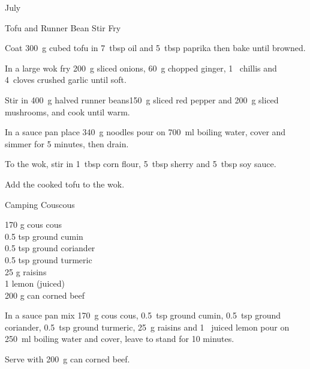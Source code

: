 \begin{menu}{July}
\begin{recipe}{2}{Tofu and Runner Bean Stir Fry}
    \begin{instructions}
    \item 
        Coat
        300~g cubed tofu
        in
        7~tbsp  oil
        and
        5~tbsp  paprika
        then bake until browned.
      \item 
        In a large wok fry 200~g sliced onions,
        60~g chopped ginger,
        1~  chillis
        and
        4~cloves crushed garlic
        until soft.
      \item 
        Stir in
        400~g halved runner beans150~g sliced red pepper
        and
        200~g sliced mushrooms,
        and cook until warm.
      \item 
    In a
    sauce pan
    place
    340~g  noodles
    pour on
    700~ml  boiling water,
    cover and simmer for 5 minutes, then drain.
  \item 
        To the wok, stir in
        1~tbsp  corn flour,
        5~tbsp  sherry
        and
        5~tbsp  soy sauce.
      \item 
        Add the cooked tofu to the wok.
      
    \end{instructions}
    \end{recipe}%
  
    \begin{recipe}{1}{Camping Couscous}%
		\begin{ingredients}
		170 g cous cous  \\
	0.5 tsp ground cumin  \\
	0.5 tsp ground coriander  \\
	0.5 tsp ground turmeric  \\
	25 g raisins  \\
	1  lemon (juiced) \\
	200 g can corned beef  \\
	
		\end{ingredients}
	
	
    \begin{instructions}
    \item 
    In a
    sauce pan
    mix
    170~g  cous cous,
    0.5~tsp  ground cumin,
    0.5~tsp  ground coriander,
    0.5~tsp  ground turmeric,
    25~g  raisins
    and
    1~ juiced lemon
    pour on
    250~ml  boiling water
    and cover, leave to stand for 10 minutes.
  \item 
        Serve with 200~g  can corned beef.
      

\end{instructions}
\end{recipe}
\end{menu}
